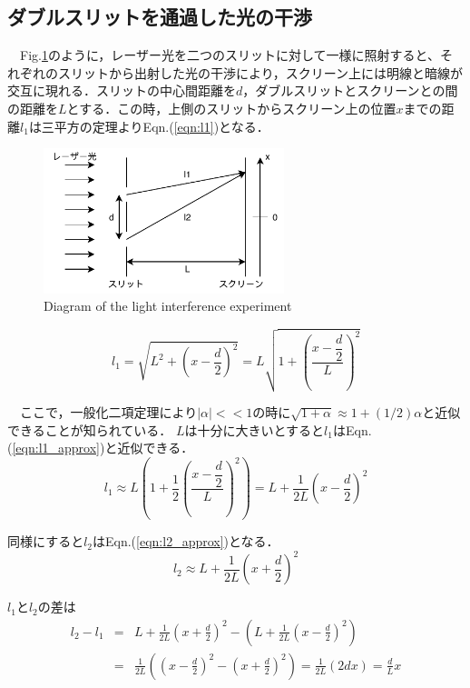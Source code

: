 \subsection{ダブルスリットを通過した光の干渉}
　Fig.\ref{fig:diagram_of_the_light_interference_experiment}のように，レーザー光を二つのスリットに対して一様に照射すると、それぞれのスリットから出射した光の干渉により，スクリーン上には明線と暗線が交互に現れる．スリットの中心間距離を$d$，ダブルスリットとスクリーンとの間の距離を$L$とする．この時，上側のスリットからスクリーン上の位置$x$までの距離$l_1$は三平方の定理よりEqn.(\ref{eqn:l1})となる．
\begin{figure}[H]
    \centering
    \includegraphics[width=7cm]{./fig/fig2.pdf}
    \caption{Diagram of the light interference experiment}
    \label{fig:diagram_of_the_light_interference_experiment}
\end{figure}

\begin{equation}
    l_1 = \sqrt{L^2+\left(x-\dfrac{d}{2}\right)^2} = L\sqrt{1+\left(\dfrac{x-\dfrac{d}{2}}{L}\right)^2}
    \label{eqn:l1}
\end{equation}

　ここで，一般化二項定理により$|α| << 1$の時に$\sqrt{1 + \alpha} \approx 1 + (1/2)\alpha$と近似できることが知られている． $L$は十分に大きいとすると$l_1$はEqn.(\ref{eqn:l1_approx})と近似できる．
\begin{equation}
    l_1 \approx L \left(1+\frac{1}{2}\left(\frac{x-\dfrac{d}{2}}{L}\right)^2\right) = L + \frac{1}{2L}\left(x-\frac{d}{2}\right)^2
    \label{eqn:l1_approx}
\end{equation}

同様にすると$l_2$はEqn.(\ref{eqn:l2_approx})となる．
\begin{equation}
    l_2 \approx  L + \frac{1}{2L}\left(x+\frac{d}{2}\right)^2
    \label{eqn:l2_approx}
\end{equation}

$l_1$と$l_2$の差は
\begin{eqnarray}
    l_2 - l_1 &=& L + \frac{1}{2L}\left(x+\frac{d}{2}\right)^2 - \left( L + \frac{1}{2L}\left(x-\frac{d}{2}\right)^2\right) \nonumber\\
    &=& \frac{1}{2L}\left(\left(x-\frac{d}{2}\right)^2-\left(x+\frac{d}{2}\right)^2\right) = \frac{1}{2L}(2dx) = \frac{d}{L}x
\end{eqnarray}

